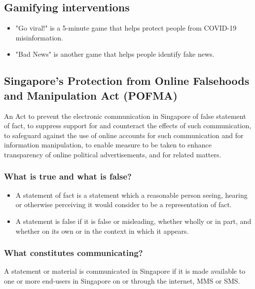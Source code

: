 \documentclass[11pt]{article}
\begin{document}
\subsection{Gamifying interventions}
\label{sec:org4786480}
\begin{itemize}
\item "Go viral!" is a 5-minute game that helps protect people from COVID-19 misinformation.
\item "Bad News" is another game that helps people identify fake news.
\end{itemize}

\subsection{Singapore's Protection from Online Falsehoods and Manipulation Act (POFMA)}
\label{sec:org3664327}
An Act to prevent the electronic communication in Singapore of false statement of fact, to suppress support for and counteract the effects of such communication, to safeguard against the use of online accounts for such communication and for information manipulation, to enable measure to be taken to enhance transparency of online political advertisements, and for related matters.

\subsubsection{What is true and what is false?}
\label{sec:org1a6d1cd}
\begin{itemize}
\item A statement of fact is a statement which a reasonable person seeing, hearing or otherwise perceiving it would consider to be a representation of fact.
\item A statement is false if it is false or misleading, whether wholly or in part, and whether on its own or in the context in which it appears.
\end{itemize}

\subsubsection{What constitutes communicating?}
\label{sec:org58e0ed7}
A statement or material is communicated in Singapore if it is made available to one or more end-users in Singapore on or through the internet, MMS or SMS.

 \newpage
\end{document}
